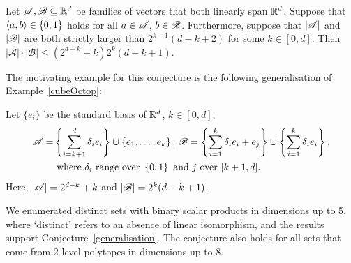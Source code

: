 \begin{conjecture}\label{generalisation}
    Let ${\mathscr{A}},{\mathscr{B}} \subseteq {\mathbb{R}}^d$ be families of vectors that both linearly span ${\mathbb{R}}^d$. Suppose that $\langle a, b\rangle \in \{0,1\}$ holds for all $a \in {\mathscr{A}}$, $b \in {\mathscr{B}}$. Furthermore, suppose that $|{\mathscr{A}}|$ and $|{\mathscr{B}}|$ are both strictly larger than $2^{k-1}(d-k+2)$ for some $k\in [0,d]$. Then $\left|\mathcal{A}\right| \cdot\left|\mathcal{B}\right| \leq (2^{d-k}+k)2^k(d-k+1)$.
\end{conjecture}
The motivating example for this conjecture is the following generalisation of Example~\ref{cubeOctop}:
\begin{example}\label{generalCubeOctop}
    Let $\{e_i\}$ be the standard basis of ${\mathbb{R}}^d$, $k\in [0,d]$,
    \begin{align*}
        {\mathscr{A}}= & \left\{\sum_{i=k+1}^{d}\delta_i e_i\right\}\cup\left\{e_1,\ldots,e_k\right\},\,{\mathscr{B}}=\left\{\sum_{i=1}^{k}\delta_i e_i + e_j\right\}\cup\left\{\sum_{i=1}^{k}\delta_i e_i\right\}, \\
        & \text{ where } \delta_i\text{ range over }\left\{0, 1\right\} \text{ and }j\text{ over }[k+1,d].
    \end{align*}
    Here, $|{\mathscr{A}}|=2^{d-k}+k$ and $|{\mathscr{B}}|=2^k (d-k+1)$.
\end{example}
We enumerated distinct sets with binary scalar products in dimensions up to 5, where `distinct' refers to an absence of linear isomorphism, and the results support Conjecture~\ref{generalisation}. The conjecture also holds for all sets that come from 2-level polytopes in dimensions up to 8.
